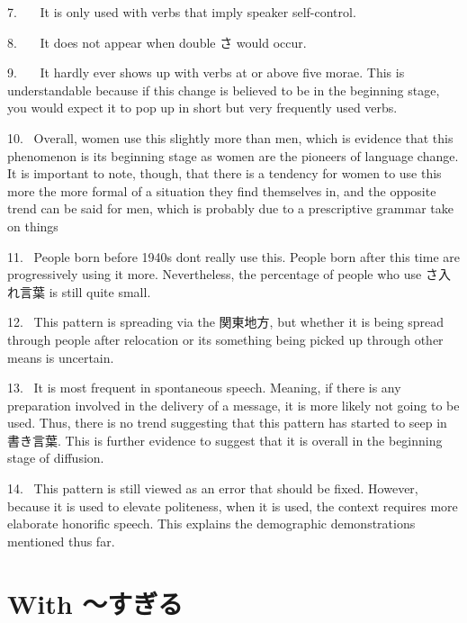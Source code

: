 \par{7.    It is only used with verbs that imply speaker self-control. }

\par{8.    It does not appear when double さ would occur. }

\par{9.    It hardly ever shows up with verbs at or above five morae. This is understandable because if this change is believed to be in the beginning stage, you would expect it to pop up in short but very frequently used verbs. }

\par{10.  Overall, women use this slightly more than men, which is evidence that this phenomenon is its beginning stage as women are the pioneers of language change. It is important to note, though, that there is a tendency for women to use this more the more formal of a situation they find themselves in, and the opposite trend can be said for men, which is probably due to a prescriptive grammar take on things }

\par{11.  People born before 1940s don\textquotesingle t really use this. People born after this time are progressively using it more. Nevertheless, the percentage of people who use さ入れ言葉 is still quite small. }

\par{12.  This pattern is spreading via the 関東地方, but whether it is being spread through people after relocation or it\textquotesingle s something being picked up through other means is uncertain. }

\par{13.  It is most frequent in spontaneous speech. Meaning, if there is any preparation involved in the delivery of a message, it is more likely not going to be used. Thus, there is no trend suggesting that this pattern has started to seep in 書き言葉. This is further evidence to suggest that it is overall in the beginning stage of diffusion. }

\par{14.  This pattern is still viewed as an error that should be fixed. However, because it is used to elevate politeness, when it is used, the context requires more elaborate honorific speech. This explains the demographic demonstrations mentioned thus far. }
      
\section{With ～すぎる}
 
